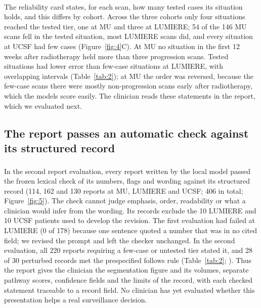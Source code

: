 \documentclass[largeformat]{interact} %
\newcommand{\expl}{\textsuperscript{\textdagger}}
\begin{document}
The reliability card\expl{} states, for each scan, how many tested cases its situation holds, and this differs by
cohort. Across the three cohorts only four situations reached the tested tier, one at MU and three at LUMIERE; 54 of
the 146 MU scans fell in the tested situation, most LUMIERE scans did, and every situation at UCSF had few cases
(Figure~\ref{fig:4}C). At MU no situation in the first 12 weeks after radiotherapy held more than three progression
scans. Tested situations had lower error than few-case situations at LUMIERE, with overlapping intervals
(Table~\ref{tab:2}); at MU the order was reversed, because the few-case scans there were mostly non-progression scans
early after radiotherapy, which the models score easily. The clinician reads these statements in the report, which
we evaluated next.

\subsection{The report passes an automatic check against its structured record}\label{sec:3.5}

In the second report evaluation\expl, every report written by the local model passed the frozen lexical check of its
numbers, flags and wording against its structured record (114, 162 and 130 reports at MU, LUMIERE and UCSF; 406 in
total; Figure~\ref{fig:5}). The check cannot judge emphasis, order, readability or what a clinician would infer from
the wording. Its records exclude the 10 LUMIERE and 10 UCSF patients used to develop the revision. The first
evaluation had failed at LUMIERE (0 of 178) because one sentence quoted a number that was in no cited field; we
revised the prompt and left the checker unchanged. In the second evaluation, all 220 reports requiring a few-case or
untested tier stated it, and 28 of 30 perturbed records met the prespecified follows rule
(Table~\ref{tab:2}; ). Thus the report gives the clinician the
segmentation figure and its volumes, separate pathway scores, confidence fields and the limits of the record, with
each checked statement traceable to a record field. No clinician has yet evaluated whether this presentation helps a
real surveillance decision.
\end{document}
